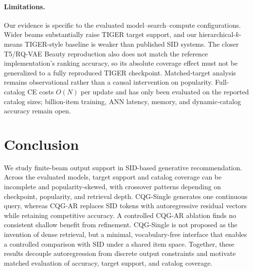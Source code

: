 \documentclass[letterpaper]{article}
\begin{document}
\paragraph{Limitations.}
Our evidence is specific to the evaluated model--search--compute
configurations. Wider beams substantially raise TIGER target support, and our
hierarchical-$k$-means TIGER-style baseline is weaker than published SID
systems. The closer T5/RQ-VAE Beauty reproduction also does not match the
reference implementation's ranking accuracy, so its absolute coverage effect
must not be generalized to a fully reproduced TIGER checkpoint. Matched-target
analysis remains observational rather than a causal intervention on
popularity. Full-catalog CE costs
$O(N)$ per update and has only been evaluated on the reported catalog sizes;
billion-item training, ANN latency, memory, and dynamic-catalog accuracy remain
open.



\section{Conclusion}
We study finite-beam output support in SID-based generative recommendation.
Across the evaluated models, target support and catalog coverage can be
incomplete and popularity-skewed, with crossover patterns depending on
checkpoint, popularity, and retrieval depth. CQG-Single generates one
continuous query, whereas CQG-AR replaces SID tokens with autoregressive
residual vectors while retaining competitive accuracy. A controlled CQG-AR
ablation finds no consistent shallow benefit from refinement. CQG-Single is not proposed as the invention of dense retrieval, but a minimal, vocabulary-free interface that enables a controlled comparison with SID under a shared item space.
Together, these results decouple autoregression from discrete output
constraints and motivate matched evaluation of accuracy, target support,
and catalog coverage.
\end{document}
